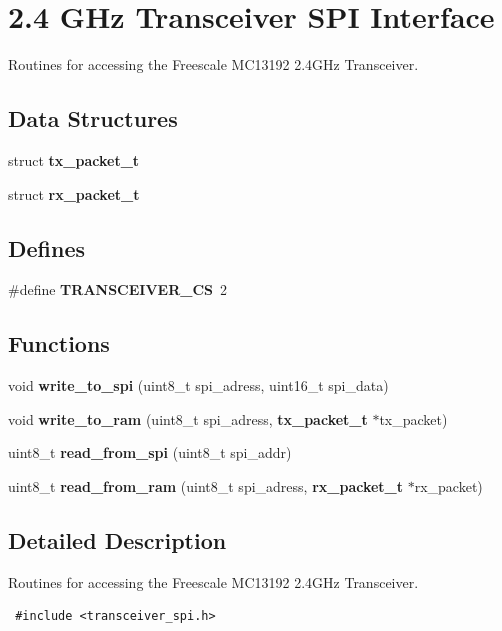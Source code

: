 \section{2.4 GHz Transceiver SPI Interface}
\label{group__ro__transceiver__spi}
Routines for accessing the Freescale MC13192 2.4GHz Transceiver.  
\subsection*{Data Structures}
\begin{CompactItemize}
\item 
struct {\bf tx\_\-packet\_\-t}
\item 
struct {\bf rx\_\-packet\_\-t}
\end{CompactItemize}
\subsection*{Defines}
\begin{CompactItemize}
\item 
\#define {\bf TRANSCEIVER\_\-CS}~2
\end{CompactItemize}
\subsection*{Functions}
\begin{CompactItemize}
\item 
void {\bf write\_\-to\_\-spi} (uint8\_\-t spi\_\-adress, uint16\_\-t spi\_\-data)
\item 
void {\bf write\_\-to\_\-ram} (uint8\_\-t spi\_\-adress, {\bf tx\_\-packet\_\-t} $\ast$tx\_\-packet)
\item 
uint8\_\-t {\bf read\_\-from\_\-spi} (uint8\_\-t spi\_\-addr)
\item 
uint8\_\-t {\bf read\_\-from\_\-ram} (uint8\_\-t spi\_\-adress, {\bf rx\_\-packet\_\-t} $\ast$rx\_\-packet)
\end{CompactItemize}


\subsection{Detailed Description}
Routines for accessing the Freescale MC13192 2.4GHz Transceiver. 



\begin{Code}\begin{verbatim} #include <transceiver_spi.h> 
\end{verbatim}\end{Code}



